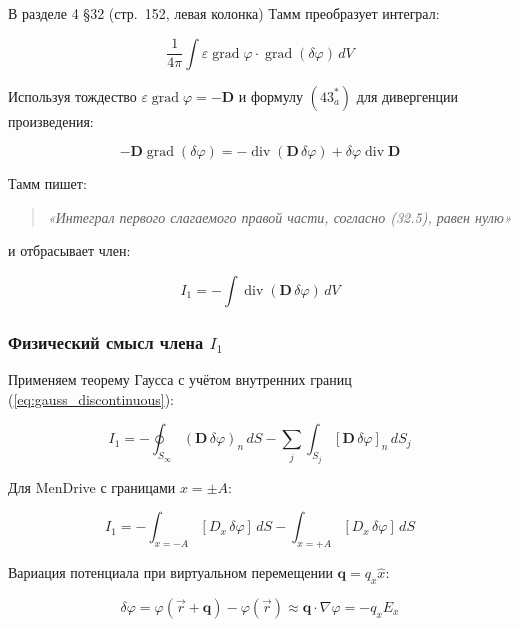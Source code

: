 \documentclass[a4paper,12pt]{article}
\begin{document}
В разделе 4 §32 (стр.~152, левая колонка) Тамм преобразует интеграл:

\begin{equation}
\frac{1}{4\pi}\int \varepsilon\operatorname{grad}\varphi\cdot
\operatorname{grad}(\delta\varphi)\,dV
\label{eq:tamm_integral_1}
\end{equation}

Используя тождество $\varepsilon\operatorname{grad}\varphi = -\mathbf{D}$ и
формулу $(43^*_a)$ для дивергенции произведения:

\begin{equation}
-\mathbf{D}\operatorname{grad}(\delta\varphi) =
-\operatorname{div}(\mathbf{D}\,\delta\varphi) +
\delta\varphi\operatorname{div}\mathbf{D}
\label{eq:divergence_identity_1}
\end{equation}

Тамм пишет:

\begin{quote}
\textit{«Интеграл первого слагаемого правой части, согласно (32.5), равен
нулю»}
\end{quote}

и отбрасывает член:

\begin{equation}
\boxed{
I_1 = -\int \operatorname{div}(\mathbf{D}\,\delta\varphi)\,dV
}
\label{eq:discarded_term_1}
\end{equation}

\subsubsection{Физический смысл члена $I_1$}

Применяем теорему Гаусса с учётом внутренних границ (\ref{eq:gauss_discontinuous}):

\begin{equation}
I_1 = -\oint_{S_\infty} (\mathbf{D}\,\delta\varphi)_n\,dS
- \sum_j \int_{S_j} [\mathbf{D}\,\delta\varphi]_n\,dS_j
\label{eq:term_1_gauss}
\end{equation}

Для MenDrive с границами $x = \pm A$:

\begin{equation}
I_1 = -\int_{x=-A} [D_x\,\delta\varphi]\,dS - \int_{x=+A} [D_x\,\delta\varphi]\,dS
\label{eq:term_1_mendrive}
\end{equation}

Вариация потенциала при виртуальном перемещении $\mathbf{q} = q_x\hat{x}$:

\begin{equation}
\delta\varphi = \varphi(\vec{r}+\mathbf{q}) - \varphi(\vec{r}) \approx
\mathbf{q}\cdot\nabla\varphi = -q_x E_x
\label{eq:potential_variation}
\end{equation}
\end{document}
